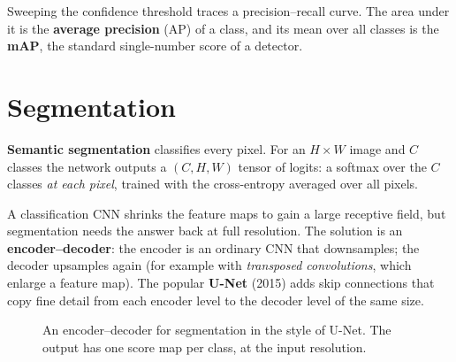 \documentclass[12pt, a4paper]{article}
\newcommand{\cuboid}[5]{%
  \pgfmathsetmacro{\off}{#3*0.3}
  \filldraw[fill=#4!20, draw=#4!80!black] (#1,-#3/2) rectangle ++(#2,#3);
  \filldraw[fill=#4!35, draw=#4!80!black]
  (#1,#3/2) -- ++(\off,\off) -- ++(#2,0) -- ++(-\off,-\off) -- cycle;
  \filldraw[fill=#4!50, draw=#4!80!black]
  (#1+#2,-#3/2) -- ++(\off,\off) -- ++(0,#3) -- ++(-\off,-\off) -- cycle;
  \node[below, font=\scriptsize, align=center] at (#1+#2/2,-1.6) {#5};
}
\begin{document}
Sweeping the confidence threshold traces a precision--recall curve. The area
under it is the \textbf{average precision} (AP) of a class, and its mean over
all classes is the \textbf{mAP}, the standard single-number score of a
detector.

\section{Segmentation}

\textbf{Semantic segmentation} classifies every pixel. For an $H \times W$
image and $C$ classes the network outputs a $(C, H, W)$ tensor of logits:
a softmax over the $C$ classes \emph{at each pixel}, trained with the
cross-entropy averaged over all pixels.

A classification CNN shrinks the feature maps to gain a large receptive
field, but segmentation needs the answer back at full resolution. The
solution is an \textbf{encoder--decoder}: the encoder is an ordinary CNN
that downsamples; the decoder upsamples again (for example with
\emph{transposed convolutions}, which enlarge a feature map). The popular
\textbf{U-Net} (2015) adds skip connections that copy fine detail from each
encoder level to the decoder level of the same size.

\begin{figure}[H]
  \centering
  \caption{An encoder--decoder for segmentation in the style of U-Net. The
    output has one score map per class, at the input resolution.}
  \label{fig:unet}
\end{figure}
\end{document}
